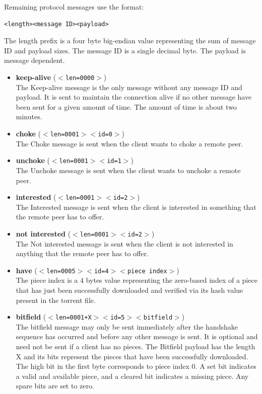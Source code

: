 Remaining protocol messages use the format:
\begin{verbatim}
<length><message ID><payload>
\end{verbatim}

The length prefix is a four byte big-endian value representing the sum of message ID and payload sizes. The message ID is a single decimal byte. The payload is message dependent.

\begin{itemize}

  \item \textbf{keep-alive} (\texttt{$<$len=0000$>$}) \\
    The Keep-alive message is the only message without any message ID and
    payload.  It is sent to maintain the connection alive if no other message
    have been sent for a given amount of time. The amount of time is about two
    minutes.

  \item \textbf{choke} (\texttt{$<$len=0001$>$$<$id=0$>$}) \\
    The Choke message is sent when the client wants to choke a remote peer.

  \item \textbf{unchoke} (\texttt{$<$len=0001$>$$<$id=1$>$}) \\
    The Unchoke message is sent when the client wants to unchoke a remote peer.

  \item \textbf{interested} (\texttt{$<$len=0001$>$$<$id=2$>$}) \\
    The Interested message is sent when the client is interested in something
    that the remote peer has to offer.

  \item \textbf{not interested} (\texttt{$<$len=0001$>$$<$id=2$>$}) \\
    The Not interested message is sent when the client is not interested in
    anything that the remote peer has to offer.

  \item \textbf{have} (\texttt{$<$len=0005$>$$<$id=4$>$$<$piece index$>$}) \\
    The piece index is a 4 bytes value representing the zero-based index of a
    piece that has just been successfully downloaded and verified via its hash
    value present in the torrent file.

  \item \textbf{bitfield} (\texttt{$<$len=0001+X$>$$<$id=5$>$$<$bitfield$>$}) \\
    The bitfield message may only be sent immediately after the handshake
    sequence has occurred and before any other message is sent. It is optional
    and need not be sent if a client has no pieces. The Bitfield payload has
    the length X and its bits represent the pieces that have been successfully
    downloaded. The high bit in the first byte corresponds to piece index 0. A
    set bit indicates a valid and available piece, and a cleared bit indicates
    a missing piece. Any spare bits are set to zero.


\end{itemize}
